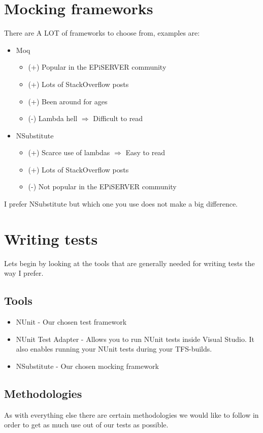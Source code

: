 \documentclass[12pt]{article}
\begin{document}
\section{Mocking frameworks}
There are A LOT of frameworks to choose from, examples are:
\begin{itemize}
	\item Moq
	\begin{itemize}
		\item (+) Popular in the EPiSERVER community
		\item (+) Lots of StackOverflow posts
		\item (+) Been around for ages
		\item (-) Lambda hell $\Rightarrow$ Difficult to read
	\end{itemize}
	\item NSubstitute
	\begin{itemize}
		\item (+) Scarce use of lambdas $\Rightarrow$ Easy to read
		\item (+) Lots of StackOverflow posts
		\item (-) Not popular in the EPiSERVER community
	\end{itemize}
\end{itemize}

I prefer NSubstitute but which one you use does not make a big difference.

\section{Writing tests}
Lets begin by looking at the tools that are generally needed for writing tests the way I prefer.

\subsection{Tools}
\begin{itemize}
	\item NUnit - Our chosen test framework
	\item NUnit Test Adapter - Allows you to run NUnit tests inside Visual Studio. It also enables running your NUnit tests during your TFS-builds.
	\item NSubstitute - Our chosen mocking framework
\end{itemize}

\subsection{Methodologies}
As with everything else there are certain methodologies we would like to follow in order to get as much use out of our tests as possible.
\end{document}
